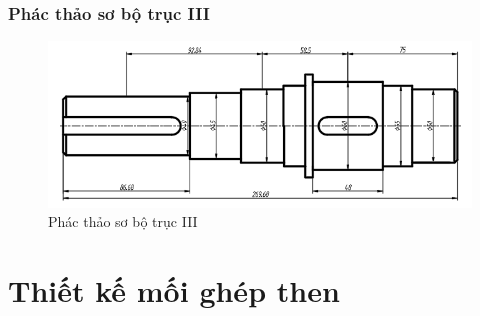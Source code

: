             \subsubsection{Phác thảo sơ bộ trục III}
               \begin{figure}[H]
                    \centering
                    \includegraphics[width=1\textwidth]{pictures/shaft_III.png}
                    \caption{Phác thảo sơ bộ trục III}
                    \label{fig:shaft_III}
                \end{figure}
    \section{Thiết kế mối ghép then}
